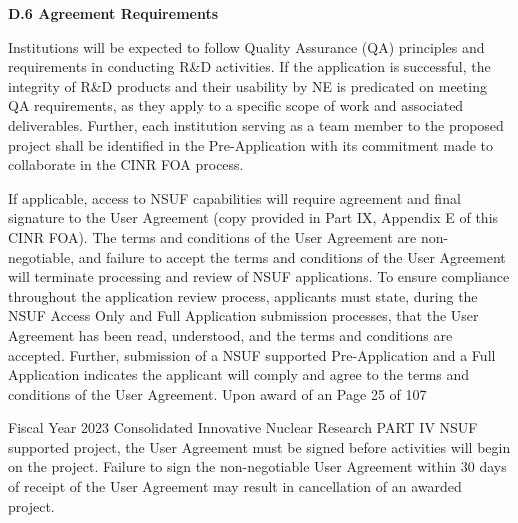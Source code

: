 {\bf D.6 Agreement Requirements}

Institutions will be expected to follow Quality Assurance (QA) principles and
requirements in conducting R\&D activities. If the application is successful,
the integrity of R\&D products and their usability by NE is predicated on
meeting QA requirements, as they apply to a specific scope of work and
associated deliverables. Further, each institution serving as a team member to
the proposed project shall be identified in the Pre-Application with its
commitment made to collaborate in the CINR FOA process.

If applicable, access to NSUF capabilities will require agreement and final
signature to the User Agreement (copy provided in Part IX, Appendix E of this
CINR FOA). The terms and conditions of the User Agreement are non-negotiable,
and failure to accept the terms and conditions of the User Agreement will
terminate processing and review of NSUF applications. To ensure compliance
throughout the application review process, applicants must state, during the
NSUF Access Only and Full Application submission processes, that the User
Agreement has been read, understood, and the terms and conditions are accepted.
Further, submission of a NSUF supported Pre-Application and a Full Application
indicates the applicant will comply and agree to the terms and conditions of
the User Agreement. Upon award of an Page 25 of 107

Fiscal Year 2023 Consolidated Innovative Nuclear Research PART IV NSUF
supported project, the User Agreement must be signed before activities will
begin on the project. Failure to sign the non-negotiable User Agreement within
30 days of receipt of the User Agreement may result in cancellation of an
awarded project.
